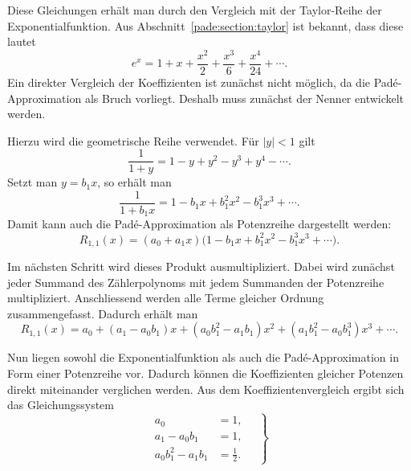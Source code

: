 Diese Gleichungen erhält man durch den Vergleich mit der Taylor-Reihe der Exponentialfunktion. Aus Abschnitt~\ref{pade:section:taylor} ist bekannt, dass diese lautet
\begin{equation*}
	e^x
	=
	1
	+
	x
	+
	\frac{x^2}{2}
	+
	\frac{x^3}{6}
	+
	\frac{x^4}{24}
	+
	\cdots.
\end{equation*}
Ein direkter Vergleich der Koeffizienten ist zunächst nicht möglich, da die Padé-Appro\-xi\-ma\-tion als Bruch vorliegt. Deshalb muss zunächst der Nenner entwickelt werden.

Hierzu wird die geometrische Reihe verwendet. Für \(|y|<1\) gilt
%
\begin{equation*}
	\frac{1}{1+y}
	=
	1-y+y^2-y^3+y^4-\cdots.
\end{equation*}
Setzt man \(y=b_1x\), so erhält man
\begin{equation*}
	\frac{1}{1+b_1x}
	=
	1
	-
	b_1x
	+
	b_1^2x^2
	-
	b_1^3x^3
	+\cdots.
\end{equation*}
Damit kann auch die Padé-Approximation als Potenzreihe dargestellt werden:
\begin{equation*}
	R_{1,1}(x)
	=
	(a_0+a_1x)
	\bigl(
	1
	-
	b_1x
	+
	b_1^2x^2
	-
	b_1^3x^3
	+\cdots
	\bigr).
\end{equation*}

Im nächsten Schritt wird dieses Produkt ausmultipliziert. Dabei wird zunächst jeder Summand des Zählerpolynoms mit jedem Summanden der Potenzreihe multipliziert. Anschliessend werden alle Terme gleicher Ordnung zusammengefasst. Dadurch erhält man
\begin{equation*}
	R_{1,1}(x)
	=
	a_0
	+
	(a_1-a_0b_1)x
	+
	(a_0b_1^2-a_1b_1)x^2
	+
	(a_1b_1^2-a_0b_1^3)x^3
	+\cdots.
\end{equation*}

Nun liegen sowohl die Exponentialfunktion als auch die Padé-Approximation in Form einer Potenzreihe vor. Dadurch können die Koeffizienten gleicher Potenzen direkt miteinander verglichen werden. Aus dem Koeffizientenvergleich ergibt sich das Gleichungssystem
\begin{equation}
\left.
	\begin{aligned}
		a_0 &= 1,\\
		a_1-a_0b_1 &= 1,\\
		a_0b_1^2-a_1b_1 &= \frac{1}{2}.
	\end{aligned}
\quad
\right\}	
	\label{pade:eq:gleichungssystem}
\end{equation}

